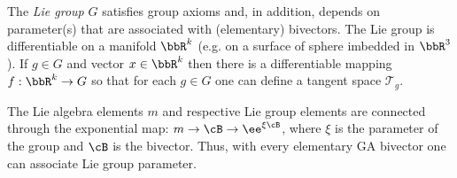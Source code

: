 %




The \textit{Lie group} $G$ satisfies group axioms  and, in
addition, depends on parameter(s) that are associated with
(elementary) bivectors. The Lie group is differentiable on a
manifold $\bbR^k$ (e.g. on a surface of sphere imbedded in
$\bbR^3$). If $g\in G$ and vector $x\in\bbR^{k}$ then there is a
differentiable mapping $f:\bbR^k\rightarrow G$ so that for each
$g\in G$ one can define a tangent space $\mathcal{T}_g$.

The Lie algebra elements $m$ and respective Lie group elements are
connected through the exponential map:
$m\rightarrow\cB\rightarrow\ee^{\xi \cB}$, where $\xi$ is the
parameter of the group and $\cB$ is the bivector. Thus, with every
elementary GA bivector one can associate Lie group parameter.
%

